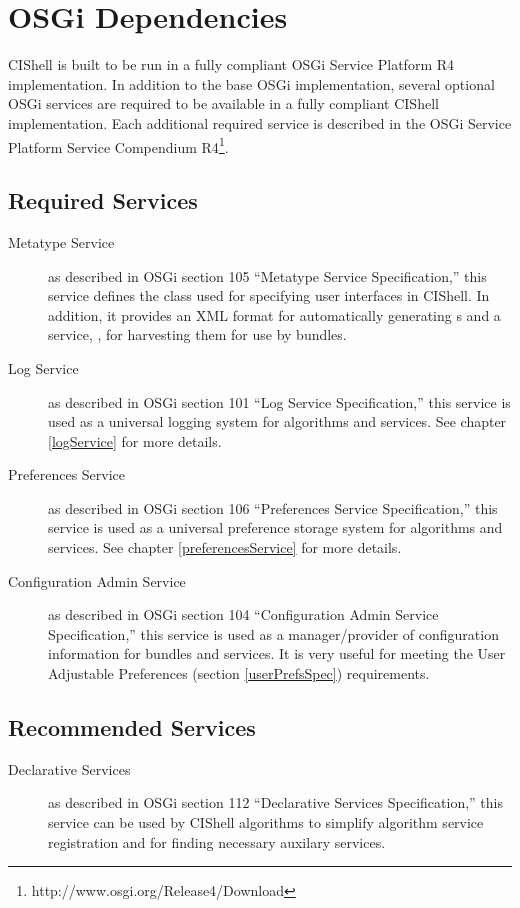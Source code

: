 \section{OSGi Dependencies}

CIShell is built to be run in a fully compliant OSGi Service Platform R4
implementation. In addition to the base OSGi implementation, several
optional OSGi services are required to be available in a fully compliant CIShell
implementation. Each additional required service is described in the OSGi
Service Platform Service Compendium
R4\footnote{http://www.osgi.org/Release4/Download}.

\subsection*{Required Services}
\begin{description}
  \item[Metatype Service] as described in OSGi section 105 ``Metatype Service
  Specification,'' this service defines the  class used
  for specifying user interfaces in CIShell. In addition, it provides an XML 
  format for automatically generating s and a service,
 , for harvesting them for use by bundles.
  \item[Log Service] as described in OSGi section 101 ``Log Service 
  Specification,'' this service is used as a universal logging system for 
  algorithms and services. See chapter \ref{logService} for more details.   
  \item[Preferences Service] as described in OSGi section 106 ``Preferences
  Service Specification,'' this service is used as a universal preference
  storage system for algorithms and services. See chapter \ref{preferencesService} for
  more details.
  \item[Configuration Admin Service] as described in OSGi section 104
  ``Configuration Admin Service Specification,'' this service is used as a
  manager/provider of configuration information for bundles and services. It is 
  very useful for meeting the User Adjustable Preferences (section
  \ref{userPrefsSpec}) requirements.
\end{description}

\subsection*{Recommended Services}
\begin{description}
  \item[Declarative Services] as described in OSGi section 112 ``Declarative
  Services Specification,'' this service can be used by CIShell algorithms to
  simplify algorithm service registration and for finding necessary auxilary services.
\end{description}
